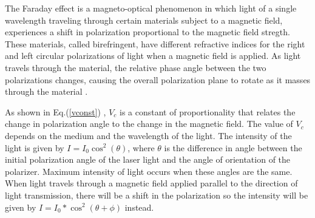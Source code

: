 \documentclass[prb,preprint]{revtex4-1}
\begin{document}
{The Faraday effect is a magneto-optical phenomenon in which light of a single wavelength traveling through certain materials subject to a magnetic field, experiences a shift in polarization proportional to the magnetic field stregth. These materials, called birefringent, have different refractive indices for the right and left circular polarizations of light when a magnetic field is applied. As light travels through the material, the relative phase angle between the two polarizations changes, causing the overall polarization plane to rotate as it masses through the material \cite{melissinos}.  

As shown in Eq.(\ref{vconst}) , $V_{c}$ is a constant of proportionality that relates the change in polarization angle to the change in the magnetic field.\cite{expphysics} The value of $V_{c}$ depends on the medium and the wavelength of the light. The intensity of the light is given by $I=I_{0}\cos^{2}(\theta)$, where $\theta$ is the difference in angle between the initial polarization angle of the laser light and the angle of orientation of the polarizer.  Maximum intensity of light occurs when these angles are the same. When light travels through a magnetic field applied parallel to the direction of light transmission, there will be a shift in the polarization so the intensity will be given by $I=I_{0}*\cos^{2}(\theta+\phi)$ instead.
}
\end{document}
